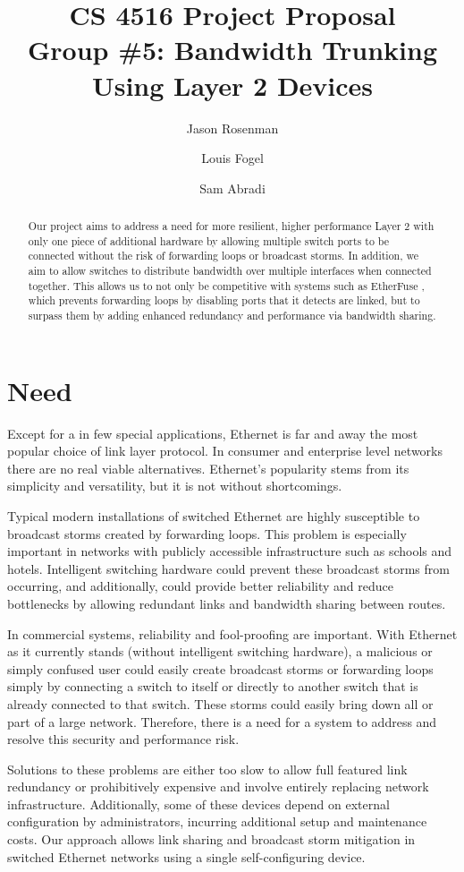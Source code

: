 \documentclass{article}
\title{CS 4516 Project Proposal\\Group \#5: Bandwidth Trunking Using Layer 2 Devices}
\author{Jason Rosenman \and Louis Fogel \and Sam Abradi}
\date{}
\begin{document}
\maketitle
\begin{abstract}
	Our project aims to address a need for more resilient, higher performance Layer 2 with only one piece of additional hardware by allowing multiple switch ports to be connected without the risk of forwarding loops or broadcast storms.
	In addition, we aim to allow switches to distribute bandwidth over multiple interfaces when connected together.
	This allows us to not only be competitive with systems such as EtherFuse \cite{etherfuse}, which prevents forwarding loops by disabling ports that it detects are linked, but to surpass them by adding enhanced redundancy and performance via bandwidth sharing.
\end{abstract}
\section{Need}
	Except for a in few special applications, Ethernet is far and away the most popular choice of link layer protocol.
	In consumer and enterprise level networks there are no real viable alternatives.
	Ethernet’s popularity stems from its simplicity and versatility, but it is not without shortcomings.

	Typical modern installations of switched Ethernet are highly susceptible to broadcast storms created by forwarding loops.
	This problem is especially important in networks with publicly accessible infrastructure such as schools and hotels.
	Intelligent switching hardware could prevent these broadcast storms from occurring, and additionally, could provide better reliability and reduce bottlenecks by allowing redundant links and bandwidth sharing between routes.
	
	In commercial systems, reliability and fool-proofing are important.
	With Ethernet as it currently stands (without intelligent switching hardware), a malicious or simply confused user could easily create broadcast storms or forwarding loops simply by connecting a switch to itself or directly to another switch that is already connected to that switch.
	These storms could easily bring down all or part of a large network.
	Therefore, there is a need for a system to address and resolve this security and performance risk.
	
	Solutions to these problems are either too slow to allow full featured link redundancy or prohibitively expensive and involve entirely replacing network infrastructure.
	Additionally, some of these devices depend on external configuration by administrators, incurring additional setup  and maintenance costs.
	Our approach allows link sharing and broadcast storm mitigation in switched Ethernet networks using a single self-configuring device.
\end{document}
